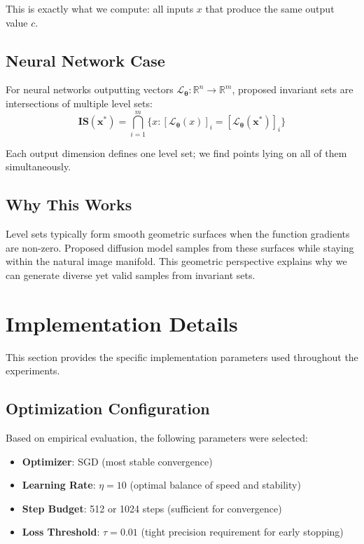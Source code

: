 This is exactly what we compute: all inputs $x$ that produce the same output value $c$.

\subsection{Neural Network Case}

For neural networks outputting vectors $\mathcal{L}_{\boldsymbol{\theta}}: \mathbb{R}^n \rightarrow \mathbb{R}^m$, proposed invariant sets are intersections of multiple level sets:
\begin{equation}
\mathbf{IS}(\mathbf{x^*}) = \bigcap_{i=1}^m \{x : [\mathcal{L}_{\boldsymbol{\theta}}(x)]_i = [\mathcal{L}_{\boldsymbol{\theta}}(\mathbf{x^*})]_i\}
\end{equation}

Each output dimension defines one level set; we find points lying on all of them simultaneously.

\subsection{Why This Works}

Level sets typically form smooth geometric surfaces when the function gradients are non-zero. Proposed diffusion model samples from these surfaces while staying within the natural image manifold. This geometric perspective explains why we can generate diverse yet valid samples from invariant sets.

\section{Implementation Details}\label{appendix:implementation}

This section provides the specific implementation parameters used throughout the experiments.

\subsection{Optimization Configuration}

Based on empirical evaluation, the following parameters were selected:
\begin{itemize}
\item \textbf{Optimizer}: SGD (most stable convergence)
\item \textbf{Learning Rate}: $\eta = 10$ (optimal balance of speed and stability)
\item \textbf{Step Budget}: 512 or 1024 steps (sufficient for convergence)
\item \textbf{Loss Threshold}: $\tau = 0.01$ (tight precision requirement for early stopping)
\end{itemize}

